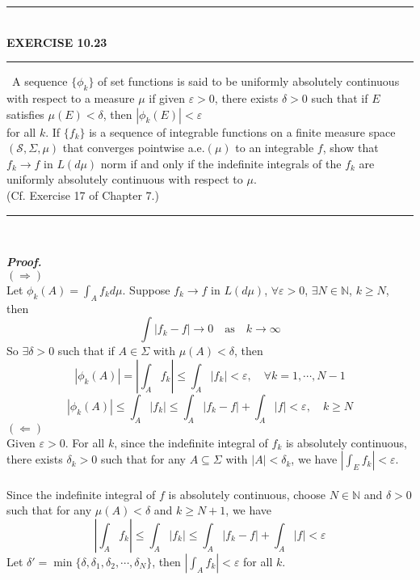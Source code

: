 \documentclass[a4paper,11pt]{article}
\begin{document}
	\begin{flushleft}
		\rule[-0.5ex]{17cm}{2pt}\\
			\textbf{EXERCISE 10.23}\\
		\rule[1.5ex]{17cm}{0.5pt}\
		A sequence $\{\phi_k\}$ of set functions is said to be uniformly absolutely continuous with respect to a measure $\mu$ if given $\varepsilon > 0$, there exists $\delta > 0$ such that if $E$ satisfies $\mu(E) < \delta$, then $|\phi_k(E)| < \varepsilon$\\for all $k$. If $\{f_k\}$ is a sequence of integrable functions on a finite measure space $(\mathscr{S}, \Sigma, \mu)$ that converges pointwise a.e.$(\mu)$ to an integrable $f$, show that $f_k \to f$ in $L(d\mu)$ norm if and only if the indefinite integrals of the $f_k$ are uniformly absolutely continuous with respect to $\mu$.\\
		(Cf. Exercise 17 of Chapter 7.)\\
	\rule[1.0ex]{17cm}{0.5pt}\
	\end{flushleft}
	\textit{\textbf {Proof.}}\\
	$(\Rightarrow)$\\
	Let $\phi_k(A) = \int_A f_k d\mu$. Suppose $f_k \to f$ in $L(d\mu)$, $\forall \varepsilon > 0$, $\exists N \in \mathbb{N}$, $k \geq N$, then
		$$\int |f_k - f| \to 0 \quad \text{as} \quad k \to \infty$$
	So $\exists \delta > 0$ such that if $A \in \Sigma$ with $\mu(A) < \delta$, then
		$$|\phi_k(A)| = |\int_A f_k| \leq \int_A |f_k| < \varepsilon, \quad \forall k = 1, \cdots, N-1$$
		$$|\phi_k(A)| \leq \int_A |f_k| \leq \int_A |f_k - f| + \int_A |f| < \varepsilon, \quad k \geq N$$
	$(\Leftarrow)$\\
	Given $\varepsilon > 0$. For all $k$, since the indefinite integral of $f_k$ is absolutely continuous, there exists $\delta_k > 0$ such that for any $A \subseteq \Sigma$ with $|A| < \delta_k$, we have $|\int_E f_k| < \varepsilon$.\\\\
	Since the indefinite integral of $f$ is absolutely continuous, choose $N \in \mathbb{N}$ and $\delta > 0$ such that for any $\mu(A) < \delta$ and $k \geq N+1$, we have
		$$|\int_A f_k|
		\leq \int_A |f_k|
		\leq \int_A |f_k - f| + \int_A |f|
		< \varepsilon$$
	Let $\delta' = \min\{ \delta, \delta_1, \delta_2, \cdots, \delta_N\}$, then $|\int_A f_k| < \varepsilon$ for all $k$.\\
\end{document}
